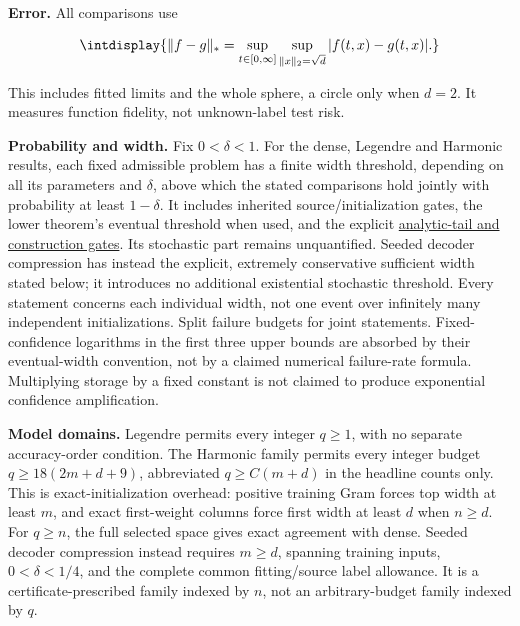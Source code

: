 
\textbf{Error.} All comparisons use


\begingroup\renewcommand{\theHequation}{intdisplay.5}
\begin{equation}
\intdisplay{
\|f-g\|_*=
\sup_{t\in[0,\infty]}\sup_{\|x\|_2=\sqrt d}|f(t,x)-g(t,x)|.
}
\label{int:eq-0002-norm}
\end{equation}
\endgroup


This includes fitted limits and the whole sphere, a circle only when \(d=2\). It measures function fidelity, not unknown-label test risk.



\textbf{Probability and width.} Fix \(0<\delta<1\). For the dense, Legendre and Harmonic results, each fixed admissible problem has a finite width threshold, depending on all its parameters and \(\delta\), above which the stated comparisons hold jointly with probability at least \(1-\delta\). It includes inherited source/initialization gates, the lower theorem's eventual threshold when used, and the explicit \hyperref[int:harmonic-storage-count]{analytic-tail and construction gates}. Its stochastic part remains unquantified. Seeded decoder compression has instead the explicit, extremely conservative sufficient width stated below; it introduces no additional existential stochastic threshold. Every statement concerns each individual width, not one event over infinitely many independent initializations. Split failure budgets for joint statements. Fixed-confidence logarithms in the first three upper bounds are absorbed by their eventual-width convention, not by a claimed numerical failure-rate formula. Multiplying storage by a fixed constant is not claimed to produce exponential confidence amplification.



\textbf{Model domains.} Legendre permits every integer \(q\ge1\), with no separate accuracy-order condition. The Harmonic family permits every integer budget \(q\ge18(2m+d+9)\), abbreviated \(q\ge C(m+d)\) in the headline counts only. This is exact-initialization overhead: positive training Gram forces top width at least \(m\), and exact first-weight columns force first width at least \(d\) when \(n\ge d\). For \(q\ge n\), the full selected space gives exact agreement with dense. Seeded decoder compression instead requires \(m\ge d\), spanning training inputs, \(0<\delta<1/4\), and the complete common fitting/source label allowance. It is a certificate-prescribed family indexed by \(n\), not an arbitrary-budget family indexed by \(q\).


